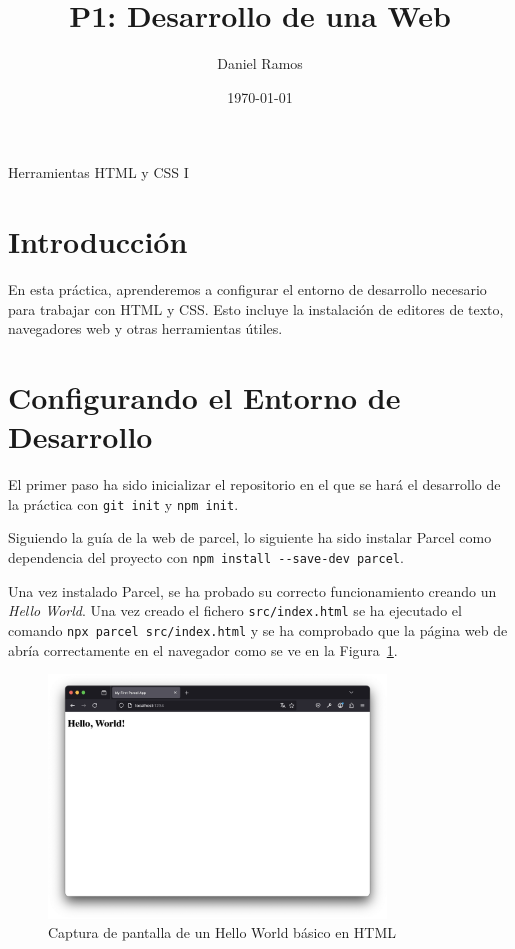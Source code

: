 \documentclass{article}
\title{P1: Desarrollo de una Web}
\author{Daniel Ramos}
\date{\today}
\begin{document}
\maketitle

\begin{center}
    \large Herramientas HTML y CSS I
\end{center}

\newpage

\tableofcontents

\newpage

\section*{Introducción}
En esta práctica, aprenderemos a configurar el entorno de desarrollo necesario para trabajar con HTML y CSS. Esto incluye la instalación de editores de texto, navegadores web y otras herramientas útiles.

\newpage

\section{Configurando el Entorno de Desarrollo}

El primer paso ha sido inicializar el repositorio en el que se hará el desarrollo de la práctica con \lstinline|git init| y \lstinline|npm init|.

Siguiendo la guía de la web de parcel, lo siguiente ha sido instalar Parcel como dependencia del proyecto con \lstinline|npm install --save-dev parcel|.

Una vez instalado Parcel, se ha probado su correcto funcionamiento creando un \textit{Hello World}. Una vez creado el fichero \lstinline|src/index.html| se ha ejecutado el comando \lstinline|npx parcel src/index.html| y se ha comprobado que la página web de abría correctamente en el navegador como se ve en la Figura~\ref{fig:hello-world}.

 \begin{figure}[h!]
     \centering
     \includegraphics[width=0.8\textwidth]{./img/hello-world}
     \caption{Captura de pantalla de un Hello World básico en HTML}
     \label{fig:hello-world}
 \end{figure}
\end{document}
